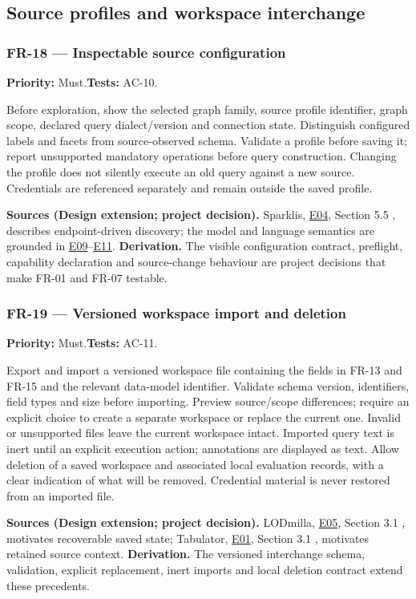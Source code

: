 \documentclass[11pt,a4paper]{article}
\newcommand{\req}[4]{\subsubsection*{#1 --- #2}\phantomsection\label{req:#1}\textbf{Priority:} #3.\quad\textbf{Tests:} #4.\par}
\newcommand{\origin}[3]{\par{\small\textbf{Sources (#1).} #2 \textbf{Derivation.} #3\par}}
\newcommand{\evidence}[1]{\hyperlink{evidence:#1}{#1}}
\begin{document}
\subsection{Source profiles and workspace interchange}
\par\noindent\begin{minipage}{\linewidth}
\req{FR-18}{Inspectable source configuration}{Must}{AC-10}
Before exploration, show the selected graph family, source profile identifier, graph scope, declared query dialect/version and connection state. Distinguish configured labels and facets from source-observed schema. Validate a profile before saving it; report unsupported mandatory operations before query construction. Changing the profile does not silently execute an old query against a new source. Credentials are referenced separately and remain outside the saved profile.
\origin{Design extension; project decision}{Sparklis, \evidence{E04}, Section 5.5 \citep{sparklis}, describes endpoint-driven discovery; the model and language semantics are grounded in \evidence{E09}--\evidence{E11}.}{The visible configuration contract, preflight, capability declaration and source-change behaviour are project decisions that make FR-01 and FR-07 testable.}
\end{minipage}\par
\par\noindent\begin{minipage}{\linewidth}
\req{FR-19}{Versioned workspace import and deletion}{Must}{AC-11}
Export and import a versioned workspace file containing the fields in FR-13 and FR-15 and the relevant data-model identifier. Validate schema version, identifiers, field types and size before importing. Preview source/scope differences; require an explicit choice to create a separate workspace or replace the current one. Invalid or unsupported files leave the current workspace intact. Imported query text is inert until an explicit execution action; annotations are displayed as text. Allow deletion of a saved workspace and associated local evaluation records, with a clear indication of what will be removed. Credential material is never restored from an imported file.
\origin{Design extension; project decision}{LODmilla, \evidence{E05}, Section 3.1 \citep{lodmilla}, motivates recoverable saved state; Tabulator, \evidence{E01}, Section 3.1 \citep{tabulator}, motivates retained source context.}{The versioned interchange schema, validation, explicit replacement, inert imports and local deletion contract extend these precedents.}
\end{minipage}\par
\end{document}
